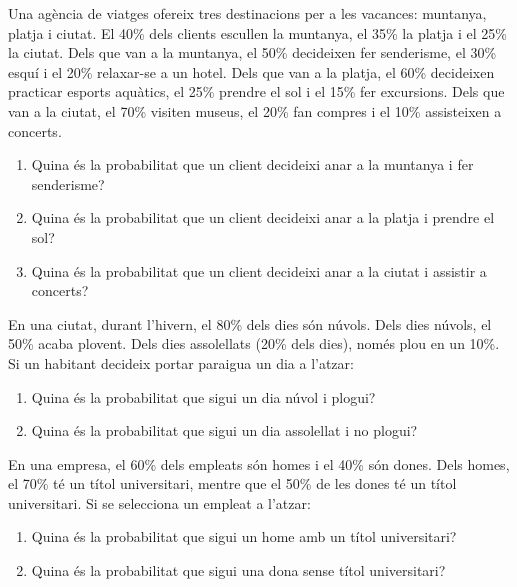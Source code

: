\documentclass[12pt]{article}
\begin{document}
\begin{exercici} [title=Exercici 2]\noindent 
Una agència de viatges ofereix tres destinacions per a les vacances: muntanya, platja i ciutat. El 40\% dels clients escullen la muntanya, el 35\% la platja i el 25\% la ciutat. Dels que van a la muntanya, el 50\% decideixen fer senderisme, el 30\% esquí i el 20\% relaxar-se a un hotel. Dels que van a la platja, el 60\% decideixen practicar esports aquàtics, el 25\% prendre el sol i el 15\% fer excursions. Dels que van a la ciutat, el 70\% visiten museus, el 20\% fan compres i el 10\% assisteixen a concerts.

\begin{enumerate}
    \item Quina és la probabilitat que un client decideixi anar a la muntanya i fer senderisme?
    \item Quina és la probabilitat que un client decideixi anar a la platja i prendre el sol?
    \item Quina és la probabilitat que un client decideixi anar a la ciutat i assistir a concerts?
\end{enumerate}
\end{exercici}

\begin{exercici} [title=Exercici 3] \noindent 
En una ciutat, durant l'hivern, el 80\% dels dies són núvols. Dels dies núvols, el 50\% acaba plovent. Dels dies assolellats (20\% dels dies), només plou en un 10\%. Si un habitant decideix portar paraigua un dia a l'atzar:
\begin{enumerate}
    \item Quina és la probabilitat que sigui un dia núvol i plogui?
    \item Quina és la probabilitat que sigui un dia assolellat i no plogui?
\end{enumerate}
\end{exercici}

\begin{exercici} [title=Exercici 4] \noindent 
En una empresa, el 60\% dels empleats són homes i el 40\% són dones. Dels homes, el 70\% té un títol universitari, mentre que el 50\% de les dones té un títol universitari. Si se selecciona un empleat a l'atzar:
\begin{enumerate}
    \item Quina és la probabilitat que sigui un home amb un títol universitari?
    \item Quina és la probabilitat que sigui una dona sense títol universitari?
\end{enumerate}
\end{exercici}
\end{document}
